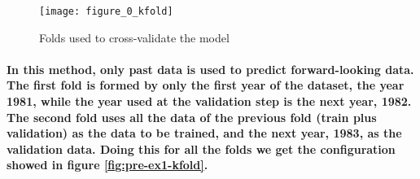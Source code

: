 \documentclass[a4paper]{article}
\begin{document}
\begin{figure}[H]
    \centering
    \texttt{[image: figure\_0\_kfold]}
    \caption{Folds used to cross-validate the model}
    \label{fig:pre-ex1-folds}
\end{figure}

\paragraph{In this method, only past data is used to predict forward-looking data. The first fold is formed by only the first year of the dataset, the year 1981, while the year used at the validation step is the next year, 1982. The second fold uses all the data of the previous fold (train plus validation) as the data to be trained, and the next year, 1983, as the validation data. Doing this for all the folds we get the configuration showed in figure \ref{fig:pre-ex1-kfold}.}
\end{document}
